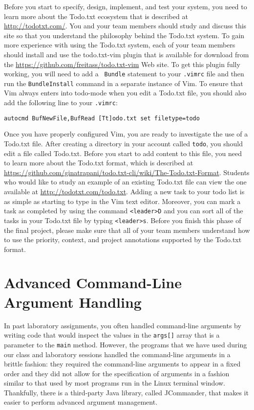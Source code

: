 Before you start to specify, design, implement, and test your system, you need to learn more about the Todo.txt
ecosystem that is described at \url{http://todotxt.com/}. You and your team members should study and discuss this site
so that you understand the philosophy behind the Todo.txt system. To gain more experience with using the Todo.txt
system, each of your team members should install and use the todo.txt-vim plugin that is available for download from the
\url{https://github.com/freitass/todo.txt-vim} Web site. To get this plugin fully working, you will need to add a {\tt
Bundle} statement to your {\tt .vimrc} file and then run the {\tt BundleInstall} command in a separate instance of Vim.
To ensure that Vim always enters into todo-mode when you edit a Todo.txt file, you should also add the following line to
your {\tt .vimrc}:

{\tt autocmd BufNewFile,BufRead [Tt]odo.txt set filetype=todo}

Once you have properly configured Vim, you are ready to investigate the use of a Todo.txt file. After creating a
directory in your account called {\tt todo}, you should edit a file called Todo.txt.  Before you start to add content to
this file, you need to learn more about the Todo.txt format, which is described at
\url{https://github.com/ginatrapani/todo.txt-cli/wiki/The-Todo.txt-Format}. Students who would like to study an example
of an existing Todo.txt file can view the one available at \url{http://todotxt.com/todo.txt}. Adding a new task to your
todo list is as simple as starting to type in the Vim text editor.  Moreover, you can mark a task as completed by using
the command {\tt <leader>D} and you can sort all of the tasks in your Todo.txt file by typing {\tt <leader>s}. Before
you finish this phase of the final project, please make sure that all of your team members understand how to use the
priority, context, and project annotations supported by the Todo.txt format.

\section*{Advanced Command-Line Argument Handling}

In past laboratory assignments, you often handled command-line arguments by writing code that would inspect the values
in the {\tt args[]} array that is a parameter to the {\tt main} method.  However, the programs that we have used during
our class and laboratory sessions handled the command-line arguments in a brittle fashion: they required the
command-line arguments to appear in a fixed order and they did not allow for the specification of arguments in a fashion
similar to that used by most programs run in the Linux terminal window. Thankfully, there is a third-party Java library,
called JCommander, that makes it easier to perform advanced argument management. 

